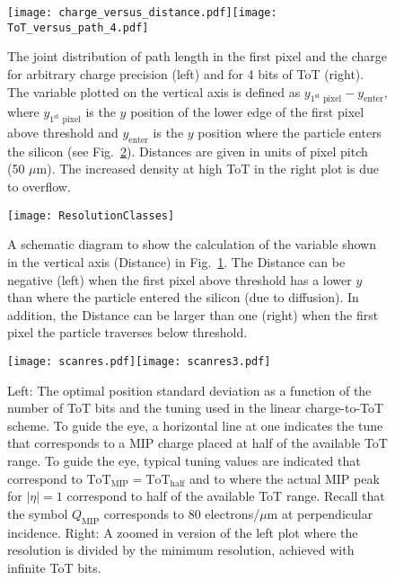 \documentclass[12pt]{article}
\begin{document}
\begin{figure}[h!]
\centering
\texttt{[image: charge\_versus\_distance.pdf]}\texttt{[image: ToT\_versus\_path\_4.pdf]}
\caption{The joint distribution of path length in the first pixel and the charge for arbitrary charge precision (left) and for 4 bits of ToT (right).  The variable plotted on the vertical axis is defined as $y_\text{$1^\text{st}$ pixel}-y_\text{enter}$, where $y_\text{$1^\text{st}$ pixel}$ is the $y$ position of the lower edge of the first pixel above threshold and $y_\text{enter}$ is the $y$ position where the particle enters the silicon (see Fig.~\ref{fig:resolution:classes}).  Distances are given in units of pixel pitch (50 $\mu$m).  The increased density at high ToT in the right plot is due to overflow.}
\label{fig:resolution:pathversuscharge}
\end{figure}

\begin{figure}[h!]
\centering
\texttt{[image: ResolutionClasses]}
\caption{A schematic diagram to show the calculation of the variable shown in the vertical axis (Distance) in Fig.~\ref{fig:resolution:pathversuscharge}.  The Distance can be negative (left) when the first pixel above threshold has a lower $y$ than where the particle entered the silicon (due to diffusion).  In addition, the Distance can be larger than one (right) when the first pixel the particle traverses below threshold.}
\label{fig:resolution:classes}
\end{figure}

\begin{figure}[h!]
\centering
\texttt{[image: scanres.pdf]}\texttt{[image: scanres3.pdf]}
\caption{Left: The optimal position standard deviation as a function of the number of ToT bits and the tuning used in the linear charge-to-ToT scheme.  To guide the eye, a horizontal line at one indicates the tune that corresponds to a MIP charge placed at half of the available ToT range.    To guide the eye, typical tuning values are indicated that correspond to $\text{ToT}_\text{MIP}=\text{ToT}_\text{half}$ and to where the actual MIP peak for $|\eta|=1$ correspond to half of the available ToT range.  Recall that the symbol $Q_\text{MIP}$ corresponds to 80 electrons/$\mu$m at perpendicular incidence. Right: A zoomed in version of the left plot where the resolution is divided by the minimum resolution, achieved with infinite ToT bits.}
\label{fig:resolution:scan}
\end{figure}
\end{document}
